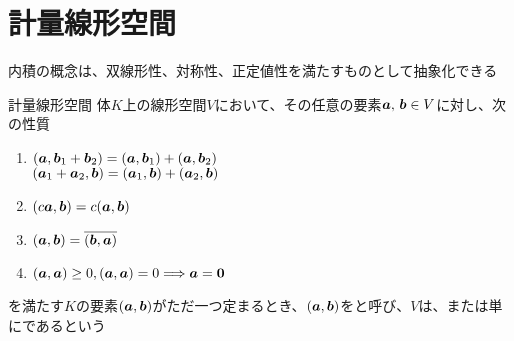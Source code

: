 \documentclass[../../../topic_linear-algebra]{subfiles}
\begin{document}
\sectionline
\section{計量線形空間}

内積の概念は、双線形性、対称性、正定値性を満たすものとして抽象化できる

\begin{definition}{計量線形空間}
  体$K$上の線形空間$V$において、その任意の要素$\vb*{a},\, \vb*{b} \in V$に対し、次の性質
  \begin{enumerate}[label=\romanlabel]
    \item $(\vb*{a}, \vb*{b}_1 + \vb*{b}_2) = (\vb*{a}, \vb*{b}_1) + (\vb*{a}, \vb*{b}_2)$ \\
          $(\vb*{a}_1 + \vb*{a}_2, \vb*{b}) = (\vb*{a}_1, \vb*{b}) + (\vb*{a}_2, \vb*{b})$
    \item $(c\vb*{a}, \vb*{b}) = c(\vb*{a}, \vb*{b})$
    \item $(\vb*{a}, \vb*{b}) = \overline{(\vb*{b}, \vb*{a})}$
    \item $(\vb*{a}, \vb*{a}) \geq 0, (\vb*{a}, \vb*{a}) = 0 \Longrightarrow \vb*{a} = \vb*{0}$
  \end{enumerate}
  を満たす$K$の要素$(\vb*{a},\vb*{b})$がただ一つ定まるとき、$(\vb*{a},\vb*{b})$をと呼び、$V$は、または単にであるという
\end{definition}
\end{document}
